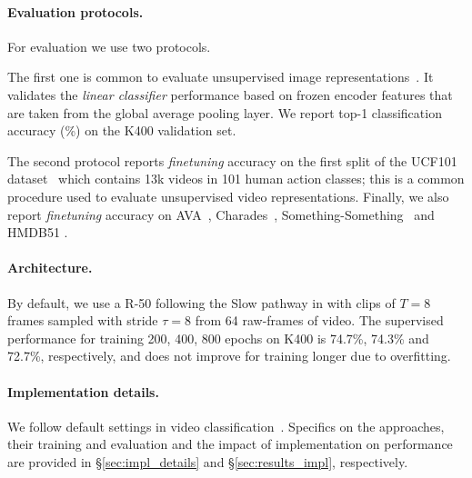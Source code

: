 \documentclass[final]{cvpr}
\begin{document}
	\paragraph{Evaluation protocols.} 
	For evaluation we use two protocols. 
	
	The first one is common to evaluate unsupervised image representations~\cite{He20, Chen20}. It validates the \textit{linear classifier} performance based on frozen encoder features that are taken from the global average pooling layer. We report top-1 classification accuracy (\%) on the K400 validation set. 
	
	The second protocol reports \textit{finetuning} accuracy on the first split of the UCF101 dataset~\cite{Soomro12} which contains 13k videos in 101 human action classes; this is a common procedure used to evaluate unsupervised video representations.
	Finally, we also report \textit{finetuning} accuracy on AVA~\cite{Gu2018},  Charades~\cite{Sigurdsson2016}, Something-Something~\cite{ssv2} and HMDB51 \cite{Kuehne11}.
	
	\paragraph{Architecture.} 
	By default, we use  a R-50 \cite{He16} following the Slow pathway in \cite{Feichtenhofer19} with clips of $T{=}$8 frames sampled with stride $\tau{=}$8 from 64 raw-frames of video. The supervised performance for training 200, 400, 800 epochs on K400 is  74.7\%, 74.3\% and 72.7\%, respectively, and does not improve for training longer due to overfitting. 

	\paragraph{Implementation details.} We follow default settings in video classification~\cite{Feichtenhofer19}. Specifics on the approaches, their training and evaluation and the impact of implementation on performance are provided in \S\ref{sec:impl_details} and \S\ref{sec:results_impl}, respectively.
	
\end{document}
